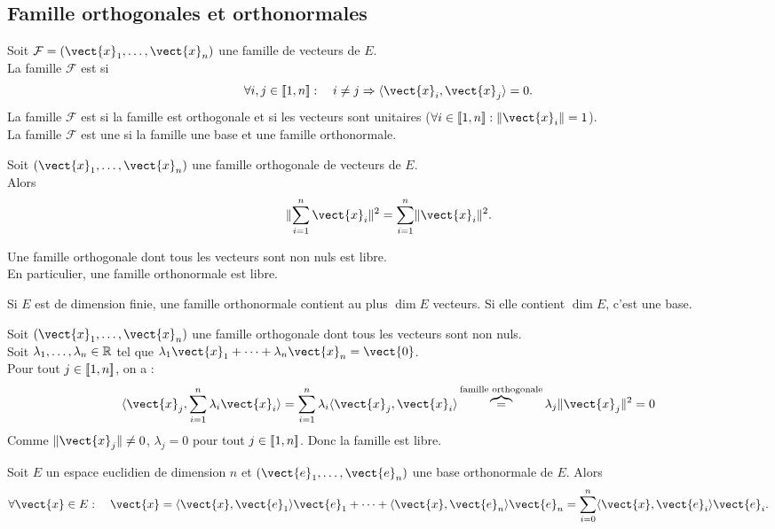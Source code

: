 \documentclass{book}
\begin{document}
\subsection{Famille orthogonales et orthonormales}   
\begin{Definition}
Soit $\mathcal{F} = (\vect{x}_1,\dots,\vect{x}_n)$ une famille de vecteurs de $E$.\\
La famille $\mathcal{F}$ est  si 
$$\forall i,j\in \Intf{1}{n}:\quad i\neq j \Rightarrow \PS{\vect{x}_i}{\vect{x}_j}=0.$$
La famille $\mathcal{F}$ est   si la famille est orthogonale et si les vecteurs sont unitaires ($\forall i\in \Intf{1}{n}:\norme{\vect{x}_i}=1$).\\
La famille $\mathcal{F}$ est une  si la famille une base et une famille orthonormale.
\end{Definition}
\begin{Theoreme}
Soit $(\vect{x}_1,\dots,\vect{x}_n)$ une famille orthogonale de vecteurs de $E$.\\
Alors \[ \norme{\sum_{i=1}^n \vect{x}_i }^2 = \sum_{i=1}^n \norme{\vect{x}_i}^2. \]
\end{Theoreme}
\begin{Proposition}[libre]
Une famille orthogonale dont tous les vecteurs sont non nuls est libre.\\
En particulier, une famille orthonormale est libre.
\end{Proposition}
Si $E$ est de dimension finie, une famille orthonormale contient au plus $\dim E$ vecteurs. Si elle contient $\dim E$, c'est une base. 
\begin{Demonstration}
Soit $(\vect{x}_1,\dots,\vect{x}_n)$ une famille orthogonale dont tous les vecteurs sont non nuls.\\
Soit $\lambda_1,\dots,\lambda_n\in\mathbb{R} $ tel que $\lambda_1\vect{x}_1+\dots+\lambda_n\vect{x}_n=\vect{0}$.\\
Pour tout $j\in \mathopen\lbrack\!\lbrack1,n \mathclose\rbrack\!\rbrack$, on a :
$$\PS{\vect{x}_j}{\sum_{i=1}^n\lambda_i\vect{x}_i}=\sum_{i=1}^n\lambda_i\PS{\vect{x}_j}{\vect{x}_i}\overbrace{=}^{\text{famille orthogonale}}\lambda_j \norme{\vect{x}_j}^2=0 $$ 
Comme $\norme{\vect{x}_j}\neq 0$, $\lambda_j=0$ pour tout $j\in \mathopen\lbrack\!\lbrack1,n \mathclose\rbrack\!\rbrack$. Donc la famille est libre.
\end{Demonstration}
\begin{Proposition}
Soit $E$ un espace euclidien de dimension $n$ et $(\vect{e}_1,\dots,\vect{e}_n)$ une base orthonormale de $E$.
Alors
$$\forall \vect{x}\in E :  \quad  \vect{x}=\PS{\vect{x}}{\vect{e}_1} \vect{e}_1+\dots+\PS{\vect{x}}{\vect{e}_n}\vect{e}_n=\sum_{i=0}^n\PS{\vect{x}}{\vect{e}_i}\vect{e}_i.$$ 
\end{Proposition}
\end{document}

